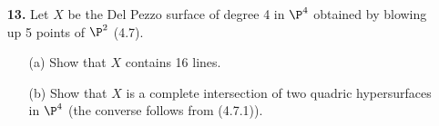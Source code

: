 \documentclass[a4paper]{article}
\begin{document}
\begin{enumerate} [label=\textbf{\arabic*.}, leftmargin=0em]
            \begin{proof}
                  By (4.11), $D$ is ample if and only if $D$ is very ample, so by Bertini's theorem, we can assume $D$ is irreducible and nonsingular as a closed subvariety of $X$.
                  In particular, $\fO_X(-D)$ has no global sections, and we have a short exact sequence
                  \[ \begin{tikzcd}
                              0 \arrow[r] & \fO_X(-D) \arrow[r] & \fO_X \arrow[r] & \fO_D \arrow[r] & 0
                        \end{tikzcd} , \]
                  where $\fO_D$ is the structure sheaf of $D$ as a variety.
                  Since $X$ is a hypersurface in $\P^3$, $$h^1(X, \fO_X) = h^1(\P^3, \fO_{\P^3}) = 0,$$ so the long exact sequence in cohomology gives
                  \[ \begin{tikzcd}
                              0 \arrow[r] & \cH^0(X, \fO_X) \arrow[r] & \cH^0(D, \fO_D) \arrow[r] & \cH^1(X, \fO_X(-D)) \arrow[r] & 0
                        \end{tikzcd}, \]
                  and since $D$ is irreducible, $$h^0(X, \fO_X) = h^0(D, \fO_D) = 1.$$
                  Hence by exactness, $\cH^1(X, \fO_X(-D)) = 0$.
            \end{proof}

      \item[\textbf{13.}] Let $X$ be the Del Pezzo surface of degree 4 in $\P^4$ obtained by blowing up 5 points of $\P^2$ (4.7).
            \begin{itemize}
                  \item[(a)] Show that $X$ contains 16 lines.
                  \item[(b)] Show that $X$ is a complete intersection of two quadric hypersurfaces in $\P^4$ (the converse follows from (4.7.1)).
            \end{itemize}


\end{enumerate}
\end{document}
